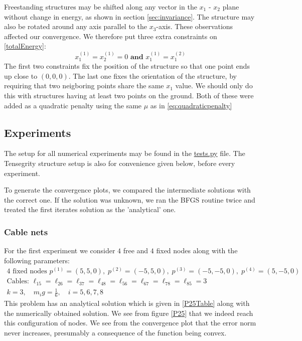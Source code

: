 Freestanding structures may be shifted along any vector in the $x_1$ - $x_2$ plane without change in energy, as shown in section \ref{sec:invariance}. The structure may also be rotated around any axis parallel to the $x_3$-axis. These observations affected our convergence. We therefore put three extra constraints on \ref{totalEnergy}:
\begin{equation}
    x_{1}^{(1)} = x_{2}^{(1)} = 0 \textbf{ and } x_{1}^{(1)} = x_{1}^{(2)}
\end{equation}
The first two constraints fix the position of the structure so that one point ends up close to $(0, 0, 0)$. The last one fixes the orientation of the structure, by requiring that two neigboring points share the same $x_1$ value. We should only do this with structures having at least two points on the ground. Both of these were added as a quadratic penalty using the same $\mu$ as in \eqref{eq:quadraticpenalty}

\subsection{Experiments}\label{sec:experiments}
The setup for all numerical experiments may be found in the \href{https://github.com/otkulseng/Opt1_Project/blob/main/Kode/tests.py}{tests.py} file. The Tensegrity structure setup is also for convenience given below, before every experiment.

To generate the convergence plots, we compared the intermediate solutions with the correct one. If the solution was unknown, we ran the BFGS routine twice and treated the first iterates solution as the 'analytical' one.

\subsubsection{Cable nets}
For the first experiment we consider $4$ free and $4$ fixed nodes along with the following parameters:
\begin{equation*}
\begin{gathered}
    4 \text{ fixed nodes } p^{(1)} = (5,5,0),\; p^{(2)} = (-5,5,0),\; p^{(3)} = (-5,-5,0),\; p^{(4)} = (5,-5,0) \\
    \text{Cables: } \ell_{15} = \ell_{26} = \ell_{37} = \ell_{48} = \ell_{56} = \ell_{67} = \ell_{78} = \ell_{85} = 3\\ 
    k = 3, \quad m_i g = \frac{1}{6}, \quad i= 5,6,7,8 
\end{gathered}
\end{equation*}
This problem has an analytical solution which is given in \eqref{P25Table} along with the numerically obtained solution. We see from figure \ref{P25} that we indeed reach this configuration of nodes. We see from the convergence plot that the error norm never increases, presumably a consequence of the function being convex. 

